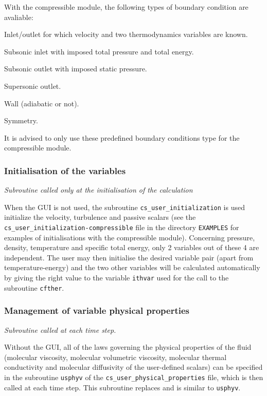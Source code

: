 {{{With the compressible module, the following types of boundary condition are avaliable:

\begin{list}{-}{}
  \item Inlet/outlet for which velocity and two thermodynamics variables are known.
  \item Subsonic inlet with imposed total pressure and total energy.
  \item Subsonic outlet with imposed static pressure.
  \item Supersonic outlet.
  \item Wall (adiabatic or not).
  \item Symmetry.
\end{list}

It is advised to only use these predefined boundary conditions type for the compressible module.

\subsubsection{Initialisation of the variables}

\noindent
\textit{Subroutine called only at the initialisation of the calculation}

When the GUI is not used, the subroutine \texttt{cs\_user\_initialization} is used
initialize the velocity, turbulence and passive scalars (see
the \texttt{cs\_user\_initialization-compressible} file in the directory \texttt{EXAMPLES}
for examples of initialisations with the compressible module). Concerning
pressure, density, temperature and specific total energy, only 2 variables out
of these 4 are independent. The user may then initialise the desired variable pair
(apart from temperature-energy) and the two other variables will be
calculated automatically by giving the right value to the variable
\texttt{ithvar} used for the call to the subroutine \texttt{cfther}.

\subsubsection{Management of variable physical properties}

\noindent
\textit{Subroutine called at each time step.}

Without the GUI, all of the laws governing the physical properties of the fluid
(molecular viscosity, molecular volumetric viscosity, molecular thermal conductivity and
molecular diffusivity of the user-defined scalars) can be specified in the subroutine \texttt{usphyv} of
the \texttt{cs\_user\_physical\_properties} file,
which is then called at each time step. This subroutine replaces and is similar to \texttt{usphyv}.

}}}
